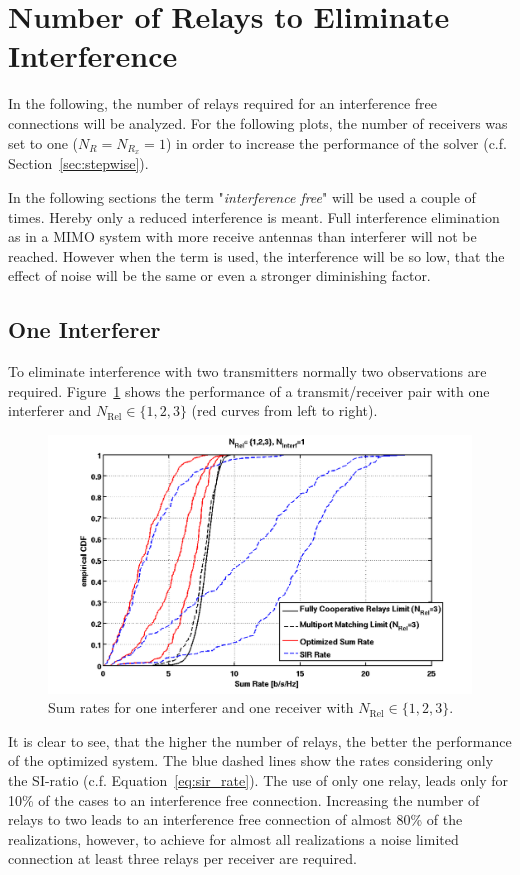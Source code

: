 \section{Number of Relays to Eliminate Interference}
\label{sec:interf_fix}
In the following, the number of relays required for an interference free connections will be analyzed.
For the following plots, the number of receivers was set to one ($N_{R} = N_{R_x} = 1$) in order to increase the performance of the solver (c.f. Section~\ref{sec:stepwise}).

In the following sections the term "\textit{interference free}" will be used a couple of times.
Hereby only a reduced interference is meant.
Full interference elimination as in a MIMO system with more receive antennas than interferer will not be reached.
However when the term is used, the interference will be so low, that the effect of noise will be the same or even a stronger diminishing factor.

\subsection{One Interferer}
\label{sec:1interf}
To eliminate interference with two transmitters normally two observations are required.
Figure~\ref{fig:relcomp_1} shows the performance of a transmit/receiver pair with one interferer and $N_\text{Rel}\in\{1,2,3\}$ (red curves from left to right).
\begin{figure}[h]
\centering
  \includegraphics[width=0.8\linewidth]{images/Relcomparison_1interferer.png}
\caption{Sum rates for one interferer and one receiver with  $N_\text{Rel}\in\{1,2,3\}$.}
\label{fig:relcomp_1}
\end{figure}
It is clear to see, that the higher the number of relays, the better the performance of the optimized system.
The blue dashed lines show the rates considering only the SI-ratio (c.f. Equation~\eqref{eq:sir_rate}).
The use of only one relay, leads only for 10\% of the cases to an interference free connection.
Increasing the number of relays to two leads to an interference free connection of almost 80\% of the realizations, however, to achieve for almost all realizations a noise limited connection at least three relays per receiver are required.


